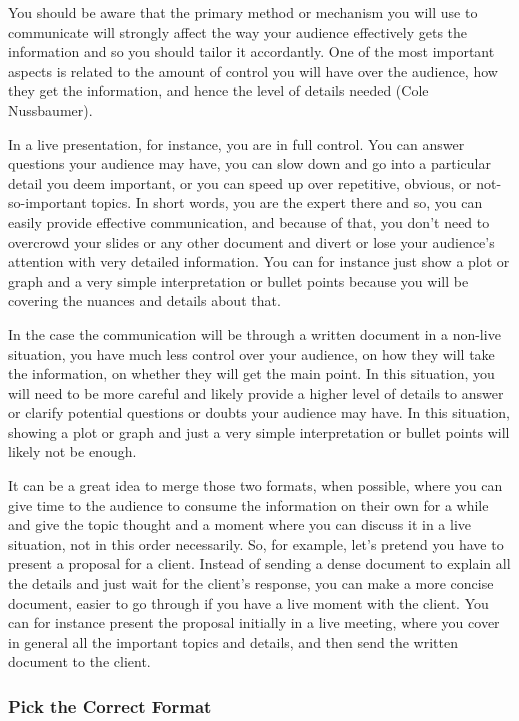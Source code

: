 \documentclass[
]{book}
\begin{document}
You should be aware that the primary method or mechanism you will use to communicate will strongly affect the way your audience effectively gets the information and so you should tailor it accordantly. One of the most important aspects is related to the amount of control you will have over the audience, how they get the information, and hence the level of details needed (Cole Nussbaumer).

In a live presentation, for instance, you are in full control. You can answer questions your audience may have, you can slow down and go into a particular detail you deem important, or you can speed up over repetitive, obvious, or not-so-important topics. In short words, you are the expert there and so, you can easily provide effective communication, and because of that, you don't need to overcrowd your slides or any other document and divert or lose your audience's attention with very detailed information. You can for instance just show a plot or graph and a very simple interpretation or bullet points because you will be covering the nuances and details about that.

In the case the communication will be through a written document in a non-live situation, you have much less control over your audience, on how they will take the information, on whether they will get the main point. In this situation, you will need to be more careful and likely provide a higher level of details to answer or clarify potential questions or doubts your audience may have. In this situation, showing a plot or graph and just a very simple interpretation or bullet points will likely not be enough.

It can be a great idea to merge those two formats, when possible, where you can give time to the audience to consume the information on their own for a while and give the topic thought and a moment where you can discuss it in a live situation, not in this order necessarily. So, for example, let's pretend you have to present a proposal for a client. Instead of sending a dense document to explain all the details and just wait for the client's response, you can make a more concise document, easier to go through if you have a live moment with the client. You can for instance present the proposal initially in a live meeting, where you cover in general all the important topics and details, and then send the written document to the client.

\hypertarget{pick-the-correct-format}{%
\subsubsection{Pick the Correct Format}\label{pick-the-correct-format}}
\end{document}
